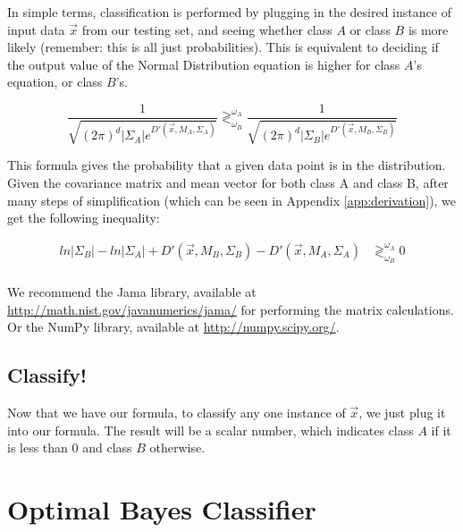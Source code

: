 \documentclass{article}
\begin{document}
In simple terms, classification is performed by plugging in the
desired instance of input data $\vec{x}$ from our testing set, and
seeing whether class $A$ or class $B$ is more likely (remember: this is all just
probabilities). This is equivalent to deciding if the output value of the Normal
Distribution equation is higher for class $A$'s equation, or class $B$'s.

\begin{displaymath}
  \dfrac{1}{\sqrt{(2\pi)^d |\Sigma_A| e^{D'(\vec{x},M_A,\Sigma_A)}}} 
  \gtrless^{\omega_A}_{\omega_B}
  \dfrac{1}{\sqrt{(2\pi)^d |\Sigma_B| e^{D'(\vec{x},M_B,\Sigma_B)}}}
\end{displaymath}

This formula gives the probability that a given data point is in the
distribution.  Given the covariance matrix and mean vector for both
class A and class B, after many steps of simplification (which can be
seen in Appendix \ref{app:derivation}), we get the following
inequality:

\begin{align*}
  ln|\Sigma_B| - ln|\Sigma_A| +
  D'(\vec{x},M_B,\Sigma_B) - D'(\vec{x},M_A,\Sigma_A)
  &\gtrless^{\omega_A}_{\omega_B}
  0 \\
\end{align*}

We recommend the Jama library, available at
\href{http://math.nist.gov/javanumerics/jama/}{http://math.nist.gov/javanumerics/jama/}
for performing the matrix calculations.  Or the NumPy library,
available at \href{http://numpy.scipy.org/}{http://numpy.scipy.org/}.

\subsection{Classify!}

Now that we have our formula, to classify any one instance of
$\vec{x}$, we just plug it into our formula.  The result will be a
scalar number, which indicates class $A$ if it is less than $0$ and class
$B$ otherwise.



\section{Optimal Bayes Classifier}
\label{sec:obayes}
\end{document}
